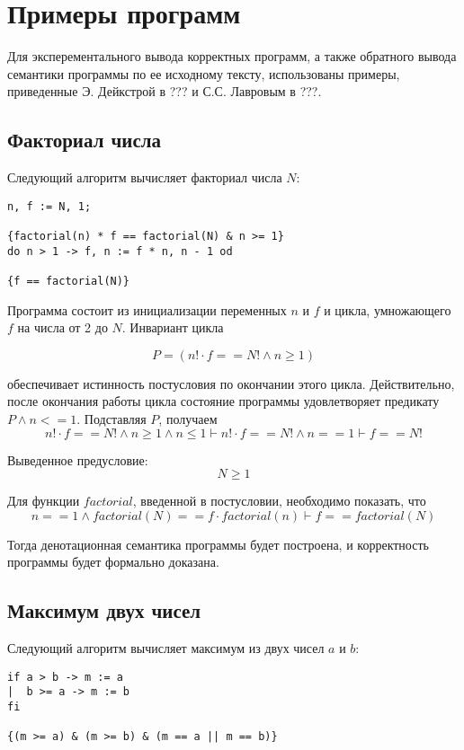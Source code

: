 \chapter{Примеры программ} \label{ch4}

Для эксперементального вывода корректных программ, а также обратного вывода семантики программы
по ее исходному тексту, использованы примеры, приведенные Э. Дейкстрой в ??? и С.С. Лавровым в ???.

\section{Факториал числа}
Следующий алгоритм вычисляет факториал числа $N$:
\begin{verbatim}
n, f := N, 1;

{factorial(n) * f == factorial(N) & n >= 1}
do n > 1 -> f, n := f * n, n - 1 od

{f == factorial(N)}
\end{verbatim}

Программа состоит из инициализации переменных $n$ и $f$ и цикла,
умножающего $f$ на числа от 2 до $N$. Инвариант цикла

\begin{equation}
    P = \left( n! \cdot f == N! \wedge n \geq 1 \right)
\end{equation}

обеспечивает истинность постусловия по окончании этого цикла. Действительно,
после окончания работы цикла состояние программы удовлетворяет предикату $P \wedge n <= 1$. Подставляя $P$, получаем
\begin{equation}
n! \cdot f == N! \wedge n \geq 1 \wedge n \leq 1  \vdash n! \cdot f == N! \wedge n == 1 \vdash f == N!
\end{equation}

Выведенное предусловие: 
\begin{equation}
    N \geq 1
\end{equation}

Для функции $factorial$, введенной в постусловии, необходимо показать, что
\begin{equation}
    n == 1 \wedge factorial(N) == f \cdot factorial(n) \vdash f == factorial(N)
\end{equation}

Тогда денотационная семантика программы будет построена, и корректность программы
будет формально доказана.

\section{Максимум двух чисел}
Следующий алгоритм вычисляет максимум из двух чисел $a$ и $b$:
\begin{BVerbatim}
if a > b -> m := a
|  b >= a -> m := b
fi

{(m >= a) & (m >= b) & (m == a || m == b)}
\end{BVerbatim}

